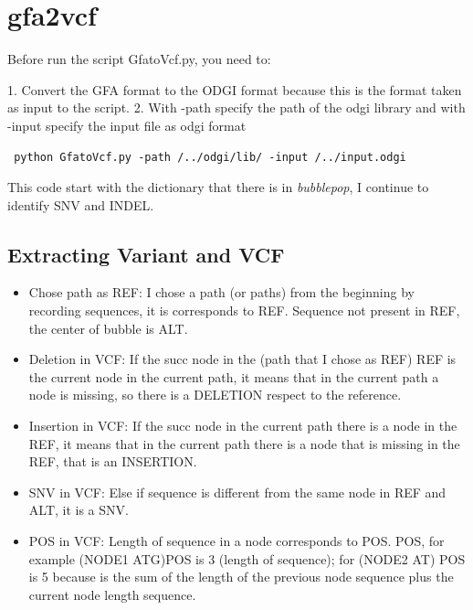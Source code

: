 \section{gfa2vcf}

Before run the script GfatoVcf.py, you need to:

1. Convert the GFA format to the ODGI format because this is the format taken as input to the script.
2. With -path specify the path of the odgi library and with -input specify the input file as odgi format

\begin{verbatim}
 python GfatoVcf.py -path /../odgi/lib/ -input /../input.odgi   
\end{verbatim}
    
This code start with the dictionary that there is in \textit{bubblepop}, I continue to identify SNV and INDEL.
\subsection{Extracting Variant and VCF}

\begin{itemize}
\item Chose path as REF: I chose a path (or paths) from the beginning by recording sequences, it is corresponds to REF. Sequence not present in REF, the center of bubble is ALT.


                    
\item Deletion in VCF: If the succ node in the (path that I chose as REF) REF is the current node in the current path, it means that in the current path a node is missing, so there is a DELETION respect to the reference.

\item Insertion in VCF: If the succ node in the current path there is a node in the REF, it means that in the current path there is a node that is missing in the REF, that is an INSERTION.

\item SNV in VCF: Else if sequence is different from the same node in REF and ALT, it is a SNV.

\item POS in VCF: Length of sequence in a node corresponds to POS.
POS, for example (NODE1 ATG)POS is 3 (length of sequence); for (NODE2 AT) POS is 5 because is the sum of the length of the previous node sequence plus the current node length sequence. \end{itemize}


